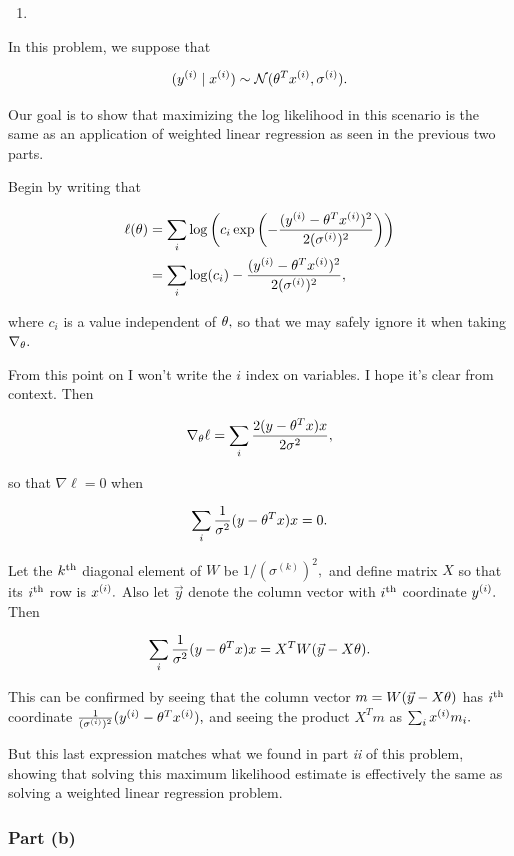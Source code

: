 \documentclass[]{article}
\begin{document}
\begin{enumerate}
\def\labelenumi{\roman{enumi}.}
\setcounter{enumi}{2}
\item
\end{enumerate}

In this problem, we suppose that

\[(y^{(i)} \mid x^{(i)}) \sim \mathcal N(\theta^T x^{(i)}, \sigma^{(i)}).\]

Our goal is to show that maximizing the log likelihood in this scenario
is the same as an application of weighted linear regression as seen in
the previous two parts.

Begin by writing that

\[\begin{aligned}
\ell(\theta) & = \sum_i \log\left(c_i \exp\left(
    -\frac{(y^{(i)} - \theta^T x^{(i)})^2}{2(\sigma^{(i)})^2}\right)\right) \\
  & = \sum_i \log(c_i) - \frac{(y^{(i)} - \theta^T x^{(i)})^2}{2(\sigma^{(i)})^2},
\end{aligned}\]

where \(c_i\) is a value independent of \(\theta,\) so that we may safely
ignore it when taking \(\nabla_\theta.\)

From this point on I won't write the \(i\) index on variables. I hope
it's clear from context. Then

\[\nabla_\theta \ell = \sum_i \frac{2(y - \theta^T x)x}{2\sigma^2},\]

so that \(\nabla\ell = 0\) when

\[\sum_i \frac{1}{\sigma^2}(y - \theta^T x)x = 0.\]

Let the \(k^\text{th}\) diagonal element of \(W\) be
\(1/(\sigma^{(k)})^2,\) and define matrix \(X\) so that its \(i^\text{th}\)
row is \(x^{(i)}.\) Also let \(\vec y\) denote the column vector with
\(i^\text{th}\) coordinate \(y^{(i)}.\) Then

\[\sum_i \frac{1}{\sigma^2}(y - \theta^T x)x = X^T W (\vec y - X\theta).\]

This can be confirmed by seeing that the column vector
\(m = W(\vec y - X\theta)\) has \(i^\text{th}\) coordinate
\(\frac{1}{(\sigma^{(i)})^2}(y^{(i)} - \theta^T x^{(i)}),\) and seeing the
product \(X^T m\) as \(\sum_i x^{(i)} m_i.\)

But this last expression matches what we found in part \emph{ii} of this
problem, showing that solving this maximum likelihood estimate is
effectively the same as solving a weighted linear regression problem.

\subsubsection{Part (b)}\label{part-b-3}
\end{document}
